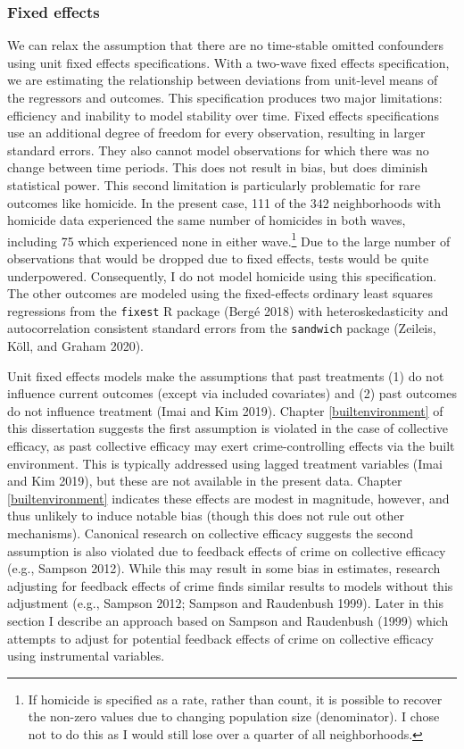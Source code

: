 \documentclass [11pt, proquest] {uwthesis}[2015/03/03]
\begin{document}
\hypertarget{fixed-effects}{%
\subsubsection{Fixed effects}\label{fixed-effects}}

We can relax the assumption that there are no time-stable omitted confounders using unit fixed effects specifications. With a two-wave fixed effects specification, we are estimating the relationship between deviations from unit-level means of the regressors and outcomes. This specification produces two major limitations: efficiency and inability to model stability over time. Fixed effects specifications use an additional degree of freedom for every observation, resulting in larger standard errors. They also cannot model observations for which there was no change between time periods. This does not result in bias, but does diminish statistical power. This second limitation is particularly problematic for rare outcomes like homicide. In the present case, 111 of the 342 neighborhoods with homicide data experienced the same number of homicides in both waves, including 75 which experienced none in either wave.\footnote{If homicide is specified as a rate, rather than count, it is possible to recover the non-zero values due to changing population size (denominator). I chose not to do this as I would still lose over a quarter of all neighborhoods.} Due to the large number of observations that would be dropped due to fixed effects, tests would be quite underpowered. Consequently, I do not model homicide using this specification. The other outcomes are modeled using the fixed-effects ordinary least squares regressions from the \texttt{fixest} R package (Bergé 2018) with heteroskedasticity and autocorrelation consistent standard errors from the \texttt{sandwich} package (Zeileis, Köll, and Graham 2020).

Unit fixed effects models make the assumptions that past treatments (1) do not influence current outcomes (except via included covariates) and (2) past outcomes do not influence treatment (Imai and Kim 2019). Chapter \ref{builtenvironment} of this dissertation suggests the first assumption is violated in the case of collective efficacy, as past collective efficacy may exert crime-controlling effects via the built environment. This is typically addressed using lagged treatment variables (Imai and Kim 2019), but these are not available in the present data. Chapter \ref{builtenvironment} indicates these effects are modest in magnitude, however, and thus unlikely to induce notable bias (though this does not rule out other mechanisms). Canonical research on collective efficacy suggests the second assumption is also violated due to feedback effects of crime on collective efficacy (e.g., Sampson 2012). While this may result in some bias in estimates, research adjusting for feedback effects of crime finds similar results to models without this adjustment (e.g., Sampson 2012; Sampson and Raudenbush 1999). Later in this section I describe an approach based on Sampson and Raudenbush (1999) which attempts to adjust for potential feedback effects of crime on collective efficacy using instrumental variables.
\end{document}
